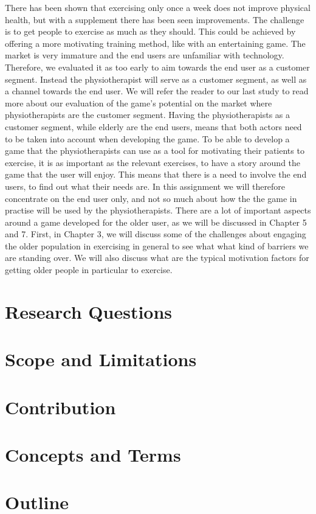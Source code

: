 There has been shown that exercising only once a week does not improve physical health, but with a supplement there has been seen improvements. The challenge is to get people to exercise as much as they should. This could be achieved by offering a more motivating training method, like with an entertaining game. The market is very immature and the end users are unfamiliar with technology. Therefore, we evaluated it as too early to aim towards the end user as a customer segment. Instead the physiotherapist will serve as a customer segment, as well as a channel towards the end user. We will refer the reader to our last study \cite{project} to read more about our evaluation of the game's potential on the market where physiotherapists are the customer segment. Having the physiotherapists as a customer segment, while elderly are the end users, means that both actors need to be taken into account when developing the game. To be able to develop a game that the physiotherapists can use as a tool for motivating their patients to exercise, it is as important as the relevant exercises, to have a story around the game that the user will enjoy. This means that there is a need to involve the end users, to find out what their needs are. In this assignment we will therefore concentrate on the end user only, and not so much about how the the game in practise will be used by the physiotherapists. There are a lot of important aspects around a game developed for the older user, as we will be discussed in Chapter 5 and 7. First, in Chapter 3, we will discuss some of the challenges about engaging the older population in exercising in general to see what what kind of barriers we are standing over. We will also discuss what are the typical motivation factors for getting older people in particular to exercise.  

\section{Research Questions}

\section{Scope and Limitations}

\section{Contribution}

\section{Concepts and Terms}

\section{Outline}